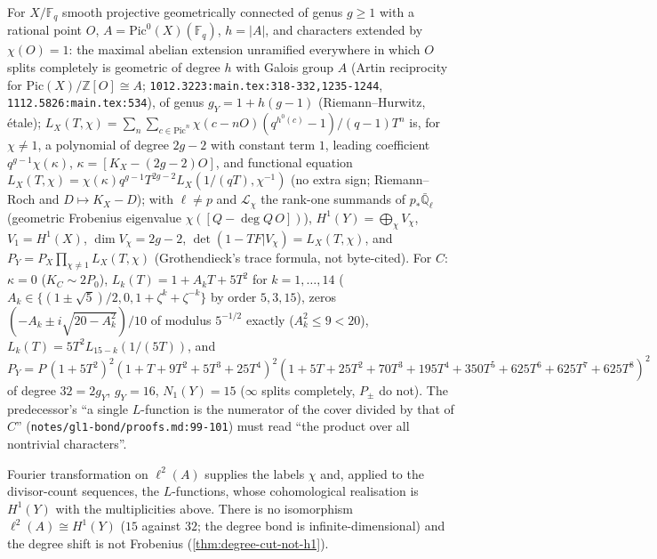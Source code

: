 \begin{theorem}
\label{thm:pointed-class-field-cohomology}
For $X/\mathbb F_q$ smooth projective geometrically connected of genus $g\ge1$ with a rational point $O$, $A = \mathrm{Pic}^0(X)(\mathbb F_q)$,
$h = |A|$, and characters extended by $\chi(O) = 1$: the maximal abelian extension unramified everywhere in which $O$ splits
completely is geometric of degree $h$ with Galois group $A$ (Artin reciprocity for $\mathrm{Pic}(X)/\mathbb Z[O]\cong A$;
\texttt{1012.3223:main.tex:318-332,1235-1244}, \texttt{1112.5826:main.tex:534}), of genus $g_Y = 1+h(g-1)$ (Riemann--Hurwitz,
\'etale);
$L_X(T,\chi) = \sum_n\sum_{c\in\mathrm{Pic}^n}\chi(c-nO)(q^{h^0(c)}-1)/(q-1)T^n$ is, for $\chi\ne1$, a polynomial of degree $2g-2$ with
constant term $1$, leading coefficient $q^{g-1}\chi(\kappa)$, $\kappa = [K_X-(2g-2)O]$, and functional equation
$L_X(T,\chi) = \chi(\kappa)q^{g-1}T^{2g-2}L_X(1/(qT),\chi^{-1})$ (no extra sign; Riemann--Roch and $D\mapsto K_X-D$); with $\ell\ne p$ and
$\mathcal L_\chi$ the rank-one summands of $p_{*}\bar{\mathbb Q}_\ell$ (geometric Frobenius eigenvalue $\chi([Q-\deg Q\,O])$),
$H^1(Y) = \bigoplus_\chi V_\chi$, $V_1 = H^1(X)$, $\dim V_\chi = 2g-2$, $\det(1-TF|V_\chi) = L_X(T,\chi)$, and
$P_Y = P_X\prod_{\chi\ne1}L_X(T,\chi)$ (Grothendieck's trace formula, not byte-cited). For $C$: $\kappa = 0$ ($K_C\sim2P_0$),
$L_k(T) = 1+A_kT+5T^2$ for $k = 1,\dots,14$ ($A_k\in\{(1\pm\sqrt5)/2, 0, 1+\zeta^k+\zeta^{-k}\}$ by order $5, 3, 15$), zeros
$(-A_k\pm i\sqrt{20-A_k^2})/10$ of modulus $5^{-1/2}$ exactly ($A_k^2\le9<20$), $L_k(T) = 5T^2L_{15-k}(1/(5T))$, and
$P_Y = P\,(1+5T^2)^2(1+T+9T^2+5T^3+25T^4)^2(1+5T+25T^2+70T^3+195T^4+350T^5+625T^6+625T^7+625T^8)^2$ of degree $32 = 2g_Y$,
$g_Y = 16$, $N_1(Y) = 15$ ($\infty$ splits completely, $P_\pm$ do not). The predecessor's ``a single $L$-function is the
numerator of the cover divided by that of $C$'' (\texttt{notes/gl1-bond/proofs.md:99-101}) must read ``the product over all
nontrivial characters''.
\end{theorem}

\begin{observation}
\label{obs:bond-h1-labels}
Fourier transformation on $\ell^2(A)$ supplies the labels $\chi$ and, applied to the divisor-count sequences, the
$L$-functions, whose cohomological realisation is $H^1(Y)$ with the multiplicities above. There is no isomorphism
$\ell^2(A)\cong H^1(Y)$ ($15$ against $32$; the degree bond is infinite-dimensional) and the degree shift is not Frobenius
(\cref{thm:degree-cut-not-h1}).
\end{observation}

